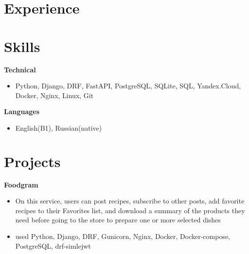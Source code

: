 \documentclass{clean_cv}
\begin{document}
\begin{datetabular}{9em}
\end{datetabular}

\section{Experience}

\begin{datetabular}{9em}

\end{datetabular}

\section{Skills}

\textbf{Technical}
 \begin{itemize}
   \item Python, Django, DRF, FastAPI, PostgreSQL, SQLite, SQL, Yandex.Cloud, Docker, Nginx, Linux, Git
   \end{itemize}
   \vspace{0.5cm}
   
\textbf{Languages}
 \begin{itemize}
   \item English(B1), Russian(native)
   \end{itemize}
   \vspace{0.5cm}
\section{Projects}

\textbf{Foodgram}\href{https://github.com/Chinpakamon/foodgram-project-react}{\color{blue}}
 \begin{itemize}
   \item  On this service, users can post recipes, subscribe to other posts, add favorite recipes to their Favorites list, and download a summary of the products they need before going to the store to prepare one or more selected dishes
   \item used Python, Django, DRF, Gunicorn, Nginx, Docker, Docker-compose, PostgreSQL, drf-simlejwt
   \end{itemize}
   \vspace{0.5cm}
   
\end{document}
